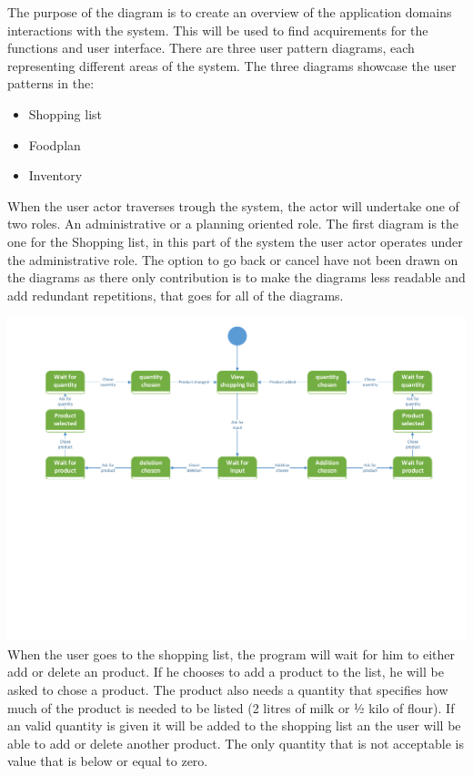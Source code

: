The purpose of the diagram is to create an overview of the application domains interactions with the system. This will be used to find acquirements for the functions and user interface. There are three user pattern diagrams, each representing different areas of the system. The three diagrams showcase the user patterns in the:
\begin{itemize}
\item{Shopping list}
\item{Foodplan}
\item{Inventory}
\end{itemize}

When the user actor traverses trough the system, the actor will undertake one of two roles. An administrative or a planning oriented role.
The first diagram is the one for the Shopping list, in this part of the system the user actor operates under the administrative role.
The option to go back or cancel have not been drawn on the diagrams as there only contribution is to make the diagrams less readable and add redundant repetitions, that goes for all of the diagrams.

\includegraphics[width=1.0\textwidth]{ApplicationDomain/upShoppingList.pdf} \label{Shopping_List_Figure}
When the user goes to the shopping list, the program will wait for him to either add or delete an product. If he chooses to add a product to the list, he will be asked to chose a product. The product also needs a quantity that specifies how much of the product is needed to be listed (2 litres of milk or ½ kilo of flour). If an valid quantity is given it will be added to the shopping list an the user will be able to add or delete another product. The only quantity that is not acceptable is value that is below or equal to zero.

